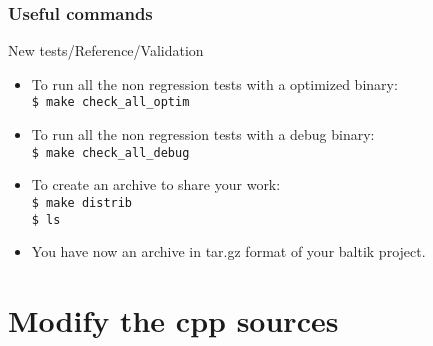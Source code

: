 \documentclass[10pt, hyperref={unicode=true,pdfusetitle, bookmarks=true,bookmarksnumbered=false,bookmarksopen=false, breaklinks=false,pdfborder={0 0 1},backref=true,colorlinks=true,linkcolor=darkblue,pageanchor, urlcolor=darkblue}]{beamer}
\begin{document}
\begin{frame}
\frametitle{Useful commands}
\begin{block}{New tests/Reference/Validation}

\begin{itemize}
\item To run all the non regression tests with a optimized binary:\\
\texttt{\$ make check\_all\_optim}
\item To run all the non regression tests with a debug binary:\\
\texttt{\$ make check\_all\_debug}
\item To create an archive to share your work:\\
\texttt{\$ make distrib}\\
\texttt{\$ ls}
\item You have now an archive in tar.gz format of your baltik project.

\end{itemize}

\end{block}
\end{frame}



\section{{\bf{Modify the cpp sources}}}
\end{document}
